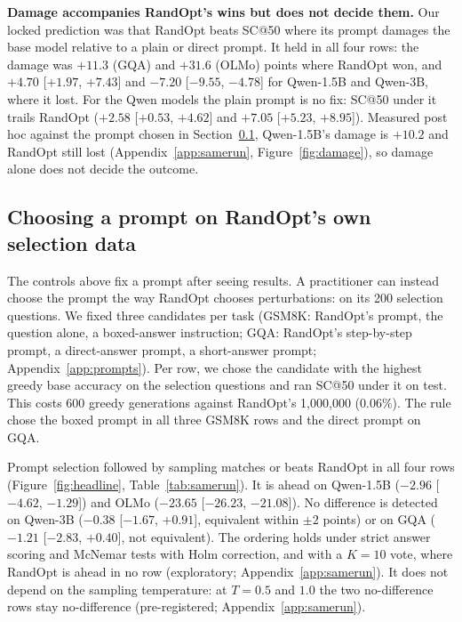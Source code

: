 \documentclass{article}
\makeatletter
\newcommand{\SC}{SC@50}
\makeatother
\begin{document}
\textbf{Damage accompanies RandOpt's wins but does not decide them.} Our locked prediction was that RandOpt beats
\SC{} where its prompt damages the base model relative to a plain or direct prompt. It held in all four rows: the damage
was $+11.3$ (GQA) and $+31.6$ (OLMo) points where RandOpt won, and $+4.70$ [$+1.97$, $+7.43$] and $-7.20$ [$-9.55$,
$-4.78$] for Qwen-1.5B and Qwen-3B, where it lost. For the Qwen models the plain prompt is no fix: \SC{} under it
trails RandOpt ($+2.58$ [$+0.53$, $+4.62$] and $+7.05$ [$+5.23$, $+8.95$]). Measured post hoc against the prompt chosen
in Section~\ref{sec:ps}, Qwen-1.5B's damage is $+10.2$ and RandOpt still lost (Appendix~\ref{app:samerun},
Figure~\ref{fig:damage}), so damage alone does not decide the outcome.

\subsection{Choosing a prompt on RandOpt's own selection data}\label{sec:ps}
The controls above fix a prompt after seeing results. A practitioner can instead choose the prompt the way RandOpt
chooses perturbations: on its 200 selection questions. We fixed three candidates per task (GSM8K: RandOpt's prompt,
the question alone, a boxed-answer instruction; GQA: RandOpt's step-by-step prompt, a direct-answer prompt, a
short-answer prompt; Appendix~\ref{app:prompts}). Per row, we chose the candidate with the highest greedy base accuracy
on the selection questions and ran \SC{} under it on test. This costs 600 greedy generations against RandOpt's
1,000,000 (0.06\%). The rule chose the boxed prompt in all three GSM8K rows and the direct prompt on GQA.

Prompt selection followed by sampling matches or beats RandOpt in all four rows (Figure~\ref{fig:headline},
Table~\ref{tab:samerun}). It is ahead on Qwen-1.5B ($-2.96$ [$-4.62$, $-1.29$]) and OLMo ($-23.65$ [$-26.23$,
$-21.08$]). No difference is detected on Qwen-3B ($-0.38$ [$-1.67$, $+0.91$], equivalent within $\pm 2$ points) or on
GQA ($-1.21$ [$-2.83$, $+0.40$], not equivalent). The ordering holds under strict answer scoring and McNemar tests with
Holm correction, and with a $K{=}10$ vote, where RandOpt is ahead in no row (exploratory; Appendix~\ref{app:samerun}).
It does not depend on the sampling temperature: at $T = 0.5$ and $1.0$ the two no-difference rows stay no-difference
(pre-registered; Appendix~\ref{app:samerun}).
\end{document}

